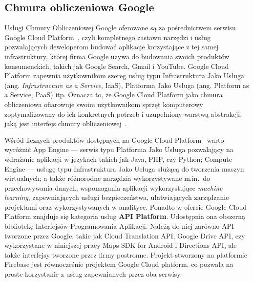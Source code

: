     \subsection{Chmura obliczeniowa Google}\label{google_cloud}

    Usługi Chmury Obliczeniowej Google oferowane są za pośrednictwem serwisu Google Cloud Platform~\cite{GCP_OVERVIEW}, czyli  kompletnego zastawu narzędzi i usług pozwalających 
    deweloperom budować aplikacje korzystające z tej samej infrastruktury, której firma Google używa do budowania swoich produktów konsumenckich, takich jak Google Search, 
    Gmail i YouTube. Google Cloud Platform zapewnia użytkownikom szereg usług typu Infrastruktura Jako Usługa (ang. \emph{Infrastructure as a Service}, IaaS), Platforma Jako 
    Usługa (ang. Platform as a Service, PaaS) itp. Oznacza to, że Google Cloud Platform jako chmura obliczeniowa ofiarowuje swoim użytkownikom sprzęt komputerowy zoptymalizowany do ich konkretnych
    potrzeb i uzupełniony warstwą abstrakcji, jaką jest interfejs chmury obliczeniowej~\cite{DEVHOST}.

    Wśród licznych produktów dostępnych na Google Cloud Platform~\cite{GCP_PRODUCTS} warto wyróżnić App Engine — serwis typu Platforma Jako Usługa pozwalający na wdrażanie aplikacji w językach
    takich jak Java, PHP, czy Python; Compute Engine — usługę typu Infrastruktura Jako Usługa służącą do tworzenia maszyn wirtualnych; a także różnorodne narzędzia wykorzystywane m.in.\ do przechowywania danych,
    wspomagania aplikacji wykorzystujące \emph{machine learning}, zapewniających usługi bezpieczeństwa,  ułatwiających  zarządzanie projektami oraz wykorzystywanych w analityce. Ponadto w ofercie Google Cloud Platform znajduje się
    kategoria usług \textbf{API Platform}. Udostępnia ona obszerną bibliotekę Interfejsów Programowania Aplikacji. Należą do niej zarówno API tworzone przez Google, takie jak Cloud 
    Translation API, Google Drive API, czy wykorzystane w niniejszej pracy Maps SDK for Android i Directions API, ale także interfejsy tworzone przez firmy postronne.
    Projekt stworzony na platformie Firebase jest równocześnie projektem Google Cloud platform, co pozwala na proste korzystanie z usług zapewnianych przez oba serwisy. \\


